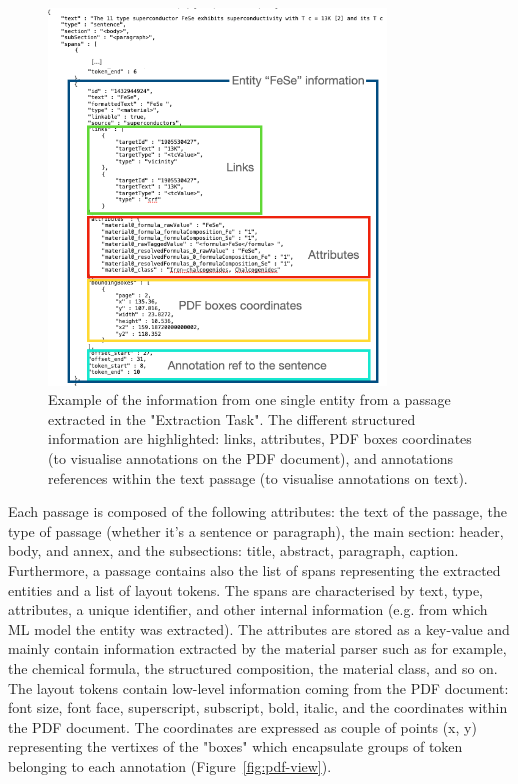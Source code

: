 \documentclass[a4paper]{article}
\begin{document}
\begin{figure}[ht]
  \centering
  \includegraphics[width=0.8\textwidth]{images/data-flow-2} 
  \caption{Example of the information from one single entity from a passage extracted in the "Extraction Task". The different structured information are highlighted: links, attributes, PDF boxes coordinates (to visualise annotations on the PDF document), and annotations references within the text passage (to visualise annotations on text).}
  \label{fig:data-flow-2}
\end{figure}

Each passage is composed of the following attributes: the text of the passage, the type of passage (whether it's a sentence or paragraph), the main section: header, body, and annex, and the subsections: title, abstract, paragraph, caption.
Furthermore, a passage contains also the list of spans representing the extracted entities and a list of layout tokens. 
The spans are characterised by text, type, attributes, a unique identifier, and other internal information (e.g. from which ML model the entity was extracted). 
The attributes are stored as a key-value and mainly contain information extracted by the material parser such as for example, the chemical formula, the structured composition, the material class, and so on.
The layout tokens contain low-level information coming from the PDF document: font size, font face, superscript, subscript, bold, italic, and the coordinates within the PDF document. The coordinates are expressed as couple of points (x, y) representing the vertixes of the "boxes" which encapsulate groups of token belonging to each annotation (Figure~\ref{fig:pdf-view}).  
\end{document}
